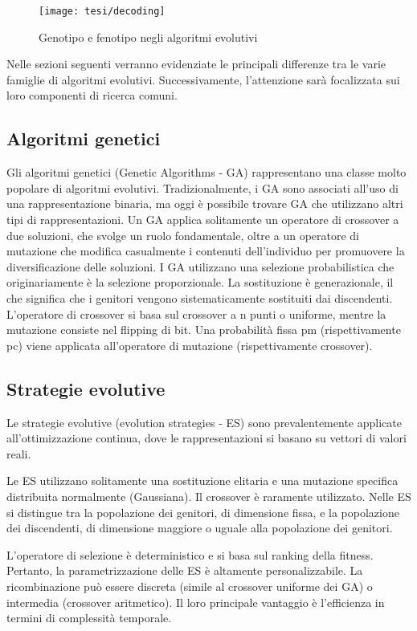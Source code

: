 \begin{figure}[h!] 
    \centering 
    \texttt{[image: tesi/decoding]} 
    \caption{Genotipo e fenotipo negli algoritmi evolutivi}
\end{figure}

Nelle sezioni seguenti verranno evidenziate le principali differenze tra le varie famiglie di algoritmi evolutivi. Successivamente, l'attenzione sarà focalizzata sui loro componenti di ricerca comuni.

\subsection{Algoritmi genetici}

Gli algoritmi genetici (Genetic Algorithms - GA) rappresentano una classe molto popolare di algoritmi evolutivi. Tradizionalmente, i GA sono associati all'uso di una rappresentazione binaria, ma oggi è possibile trovare GA che utilizzano altri tipi di rappresentazioni. Un GA applica solitamente un operatore di crossover a due soluzioni, che svolge un ruolo fondamentale, oltre a un operatore di mutazione che modifica casualmente i contenuti dell'individuo per promuovere la diversificazione delle soluzioni. I GA utilizzano una selezione probabilistica che originariamente è la selezione proporzionale. La sostituzione è generazionale, il che significa che i genitori vengono sistematicamente sostituiti dai discendenti. L'operatore di crossover si basa sul crossover a n punti o uniforme, mentre la mutazione consiste nel flipping di bit. Una probabilità fissa pm (rispettivamente pc) viene applicata all'operatore di mutazione (rispettivamente crossover).

\subsection{Strategie evolutive}

Le strategie evolutive (evolution strategies - ES) sono prevalentemente applicate all'ottimizzazione continua, dove le rappresentazioni si basano su vettori di valori reali.

Le ES utilizzano solitamente una sostituzione elitaria e una mutazione specifica distribuita normalmente (Gaussiana). Il crossover è raramente utilizzato. Nelle ES si distingue tra la popolazione dei genitori, di dimensione fissa, e la popolazione dei discendenti, di dimensione maggiore o uguale alla popolazione dei genitori. 

L'operatore di selezione è deterministico e si basa sul ranking della fitness. Pertanto, la parametrizzazione delle ES è altamente personalizzabile. La ricombinazione può essere discreta (simile al crossover uniforme dei GA) o intermedia (crossover aritmetico). Il loro principale vantaggio è l'efficienza in termini di complessità temporale.

